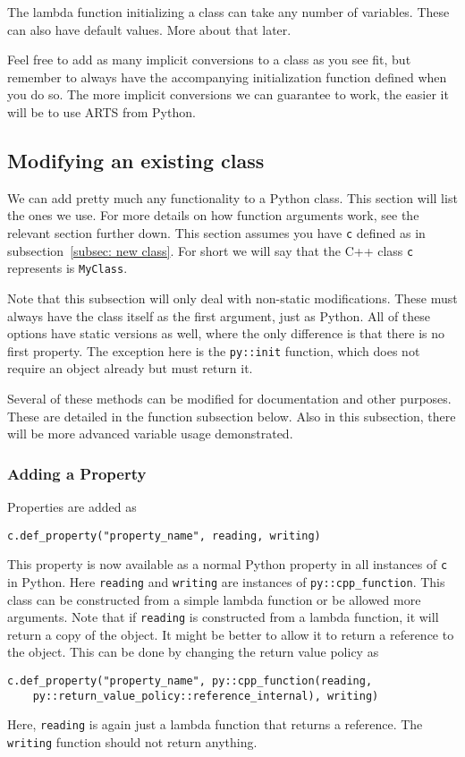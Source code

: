 The lambda function initializing a class can take any number of variables. These can also have default values.  More about that later.

Feel free to add as many implicit conversions to a class as you see fit, but remember to always have the accompanying
initialization function defined when you do so.  The more implicit conversions we can guarantee to work, the easier it
will be to use ARTS from Python.

\subsection{Modifying an existing class}
We can add pretty much any functionality to a Python class.  This section will list the ones we use.
For more details on how function arguments work, see the relevant section further down.
This section assumes you have \verb|c| defined as in subsection~\ref{subsec: new class}.  For short
we will say that the C++ class \verb|c| represents is \verb|MyClass|.

Note that this subsection will only deal with non-static modifications.  These must always have
the class itself as the first argument, just as Python.  All of these options have static
versions as well, where the only difference is that there is no first property.  The exception here
is the \verb|py::init| function, which does not require an object already but must return it.

Several of these methods can be modified for documentation and other purposes.
These are detailed in the function subsection below.  Also in this subsection,
there will be more advanced variable usage demonstrated.

\subsubsection{Adding a Property}
Properties are added as
\begin{verbatim}
c.def_property("property_name", reading, writing)
\end{verbatim}
This property is now available as a normal Python property in all instances of \verb|c| in Python.
Here \verb|reading| and \verb|writing| are instances of \verb|py::cpp_function|.  This class
can be constructed from a simple lambda function or be allowed more arguments.  Note that if \verb|reading|
is constructed from a lambda function, it will return a copy of the object.  It might be better to allow it to return
a reference to the object.  This can be done  by changing the return value policy as
\begin{verbatim}
c.def_property("property_name", py::cpp_function(reading, 
    py::return_value_policy::reference_internal), writing)
\end{verbatim}
Here, \verb|reading| is again just a lambda function that returns a reference. The 
\verb|writing| function should not return anything.

